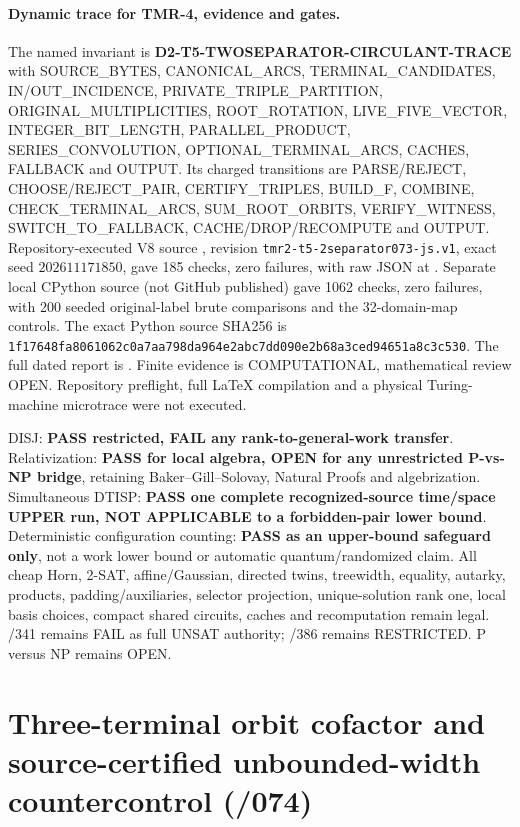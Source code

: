 \documentclass[11pt]{article}
\begin{document}
\paragraph{Dynamic trace for TMR-4, evidence and gates.}
The named invariant is
\textbf{D2-T5-TWOSEPARATOR-CIRCULANT-TRACE} with
SOURCE_BYTES, CANONICAL_ARCS, TERMINAL_CANDIDATES,
IN/OUT_INCIDENCE, PRIVATE_TRIPLE_PARTITION,
ORIGINAL_MULTIPLICITIES, ROOT_ROTATION, LIVE_FIVE_VECTOR,
INTEGER_BIT_LENGTH, PARALLEL_PRODUCT, SERIES_CONVOLUTION,
OPTIONAL_TERMINAL_ARCS, CACHES, FALLBACK and OUTPUT.
Its charged transitions are PARSE/REJECT, CHOOSE/REJECT_PAIR,
CERTIFY_TRIPLES, BUILD_F, COMBINE, CHECK_TERMINAL_ARCS,
SUM_ROOT_ORBITS, VERIFY_WITNESS, SWITCH_TO_FALLBACK,
CACHE/DROP/RECOMPUTE and OUTPUT.
Repository-executed V8 source
,
revision \texttt{tmr2-t5-2separator073-js.v1}, exact seed
$202611171850$, gave 185 checks, zero failures,
with raw JSON at
.
Separate local CPython source (not GitHub published)
gave 1062 checks, zero failures, with 200 seeded
original-label brute comparisons and the 32-domain-map
controls. The exact Python source SHA256 is
\texttt{1f17648fa8061062c0a7aa798da964e2abc7dd090e2b68a3ced94651a8c3c530}.
The full dated report is
.
Finite evidence is COMPUTATIONAL, mathematical review OPEN.
Repository preflight, full LaTeX compilation and a physical
Turing-machine microtrace were not executed.

DISJ: \textbf{PASS restricted, FAIL any rank-to-general-work
transfer}. Relativization: \textbf{PASS for local algebra,
OPEN for any unrestricted P-vs-NP bridge}, retaining
Baker--Gill--Solovay, Natural Proofs and algebrization.
Simultaneous DTISP: \textbf{PASS one complete
recognized-source time/space UPPER run, NOT APPLICABLE to
a forbidden-pair lower bound}. Deterministic configuration
counting: \textbf{PASS as an upper-bound safeguard only},
not a work lower bound or automatic quantum/randomized claim.
All cheap Horn, 2-SAT, affine/Gaussian, directed twins,
treewidth, equality, autarky, products, padding/auxiliaries,
selector projection, unique-solution rank one, local basis
choices, compact shared circuits, caches and recomputation
remain legal. /341 remains FAIL as full UNSAT authority;
/386 remains RESTRICTED. P versus NP remains OPEN.

\section{Three-terminal orbit cofactor and source-certified unbounded-width countercontrol (/074)}
\end{document}

